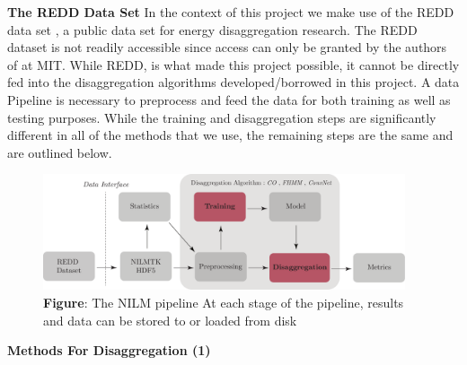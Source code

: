\documentclass[landscape,fontscale=0.48,margin=2cm,paperwidth=135truecm,paperheight=89truecm]{baposter}
\begin{document}
\begin{poster}
\begin{posterbox}[column=0,below=auto,height=bottom]{\LARGE \bfseries The REDD Data Set}
In the context of this project we make use of the REDD data set \cite{REDD}, a public data set for energy disaggregation research. The REDD dataset is not readily accessible since access can only be granted by the authors of \cite{REDD} at MIT. While REDD, is what made this project possible, it cannot be directly fed into the disaggregation algorithms developed/borrowed in this project. A data Pipeline is necessary to preprocess and feed the data for both training as well as testing purposes. While the training and disaggregation steps are significantly different in all of the methods that we use, the remaining steps are the same and are outlined below.
\begin{figure}
\begin{center}
\includegraphics[width=0.95\textwidth]{NILM_Data_Pipeline}
\caption*{\footnotesize  \textbf{Figure}: The NILM pipeline At each stage of the pipeline, results and data can be stored to or loaded from disk} \vspace*{-1 cm}
\end{center}
\end{figure}
\end{posterbox}



%
\begin{posterbox}[column=1, height = bottom]{\LARGE \bfseries Methods For Disaggregation (1)}
\vspace{1em}


\end{posterbox}
\end{poster}
\end{document}
